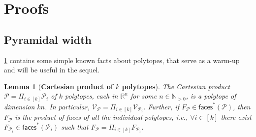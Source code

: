 \documentclass[twoside]{article}
\newcommand{\R}{\mathbb{R}}
\newcommand{\mP}{\mathcal{P}}
\newcommand{\verts}[1]{\mathcal{V}_{#1}}
\newcommand{\faces}[1]{{\mathsf{faces}^\ast}\left(#1\right)}
\newtheorem{lemma}[theorem]{Lemma}
\begin{document}
\section{Proofs}\label{a:proofs}

\subsection{Pyramidal width}\label{a:pw}

\cref{fact:cart_prod_kpolytopes} contains some simple known facts about polytopes, that serve as a warm-up and will be useful in the sequel.

\begin{lemma}[\textbf{Cartesian product of $k$ polytopes}]\label{fact:cart_prod_kpolytopes}
The Cartesian product $\mP = \Pi_{i \in [k]} \mP_i$ of $k$ polytopes, each in $\R^n$ for some $n \in \mathbb{N}_{>0}$, is a polytope of dimension $kn$.
In particular, $\verts{\mP} = \Pi_{i \in [k]}\verts{\mP_i}$.
Further, if $F_\mP \in \faces{\mP}$, then  $F_\mP$ is the product of faces of all the individual polytopes, i.e., $\forall i \in [k]$ there exist $F_{\mP_i} \in \faces{\mP_i}$ such that $F_\mP = \Pi_{i \in [k]} F_{\mP_i}$.
\end{lemma}
\end{document}
